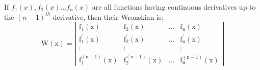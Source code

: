 If $f_{1}(x), f_{2}(x)... f_{n}(x)$  are all functions
having continuous derivatives up to the $(n-1)^{th}$  derivative, then their 
Wronskian is:
\[ \mathrm{W(x)} = 
\left | 
\begin{array}{cccc} 
  \mathrm{f}_1 \mathrm{(x)} 
  & \mathrm{f}_2 \mathrm{(x)} 
  & ... 
  & \mathrm{f}_{\mathrm{n}} \mathrm{(x)}
  \\
  \mathrm{f} ^{\prime} _1 \mathrm{(x)} 
  & \mathrm{f} ^{\prime} _2 \mathrm{(x)} 
  & ... 
  & \mathrm{f} ^{\prime} _{\mathrm{n}} \mathrm{(x)}
  \\
  \vdots 
  & 
  \vdots 
  & 
  & 
  \vdots 
  \\
  \mathrm{f}_1 ^{\mathrm{(n-1)}} \mathrm{(x)} 
  & \mathrm{f}_2 ^{\mathrm{(n-1)}} \mathrm{(x)} 
  & ... 
  & \mathrm{f}_{\mathrm{n}} ^{\mathrm{(n-1)}} \mathrm{(x)} 
  \end{array} 
\right | \]